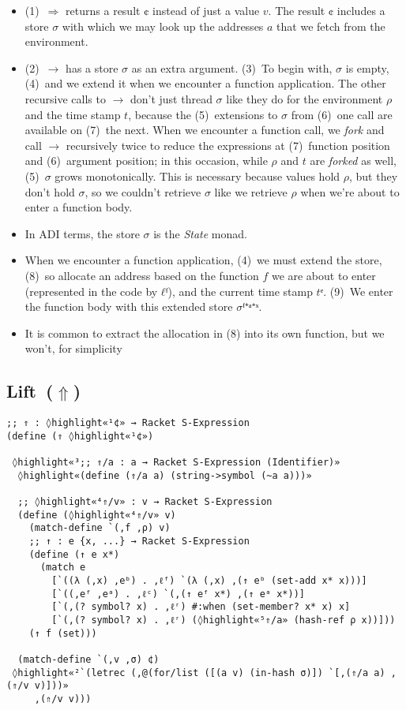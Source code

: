 \documentclass[12pt, oneside]{book}
\begin{document}
\begin{itemize}
  \item (1)~\(⇒\) returns a result \(¢\) instead of just a value \(v\). The result \(¢\) includes a store \(σ\) with which we may look up the addresses \(a\) that we fetch from the environment.
  \item (2)~\(→\) has a store \(σ\) as an extra argument. (3)~To begin with, \(σ\) is empty, (4)~and we extend it when we encounter a function application. The other recursive calls to \(→\) don’t just thread \(σ\) like they do for the environment \(ρ\) and the time stamp \(t\), because the (5)~extensions to \(σ\) from (6)~one call are available on (7)~the next. When we encounter a function call, we \emph{fork} and call \(→\) recursively twice to reduce the expressions at (7)~function position and (6)~argument position; in this occasion, while \(ρ\) and \(t\) are \emph{forked} as well, (5)~\(σ\) grows monotonically. This is necessary because values hold \(ρ\), but they don’t hold \(σ\), so we couldn’t retrieve \(σ\) like we retrieve \(ρ\) when we’re about to enter a function body.
  \item In ADI terms, the store \(σ\) is the \emph{State} monad.
  \item When we encounter a function application, (4)~we must extend the store, (8)~so allocate an address based on the function \(f\) we are about to enter (represented in the code by \(ℓᶠ\)), and the current time stamp \(tᵉ\). (9)~We enter the function body with this extended store \(σᶠ⁺ᵃ⁺ˣ\).
  \item It is common to extract the allocation in (8) into its own function, but we won’t, for simplicity
\end{itemize}

\subsection{Lift~(\(⇑\))}

\begin{Verbatim}
;; ⇑ : ◊highlight«¹¢» → Racket S-Expression
(define (⇑ ◊highlight«¹¢»)

 ◊highlight«³;; ⇑/a : a → Racket S-Expression (Identifier)»
  ◊highlight«(define (⇑/a a) (string->symbol (~a a)))»

  ;; ◊highlight«⁴⇑/v» : v → Racket S-Expression
  (define (◊highlight«⁴⇑/v» v)
    (match-define `(,f ,ρ) v)
    ;; ↑ : e {x, ...} → Racket S-Expression
    (define (↑ e x*)
      (match e
        [`((λ (,x) ,eᵇ) . ,ℓᶠ) `(λ (,x) ,(↑ eᵇ (set-add x* x)))]
        [`((,eᶠ ,eᵃ) . ,ℓᶜ) `(,(↑ eᶠ x*) ,(↑ eᵃ x*))]
        [`(,(? symbol? x) . ,ℓʳ) #:when (set-member? x* x) x]
        [`(,(? symbol? x) . ,ℓʳ) (◊highlight«⁵⇑/a» (hash-ref ρ x))]))
    (↑ f (set)))

  (match-define `(,v ,σ) ¢)
 ◊highlight«²`(letrec (,@(for/list ([(a v) (in-hash σ)]) `[,(⇑/a a) ,(⇑/v v)]))»
     ,(⇑/v v)))
\end{Verbatim}
\end{document}
